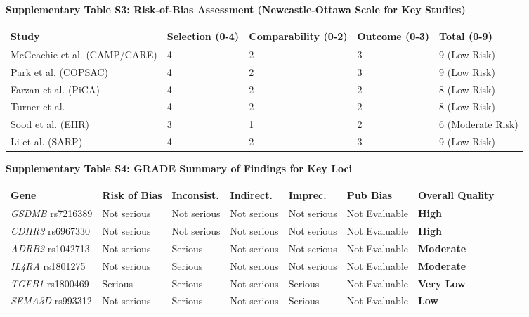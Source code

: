 \documentclass[11pt,a4paper]{article}
\begin{document}
\noindent\textbf{Supplementary Table S3: Risk-of-Bias Assessment (Newcastle-Ottawa Scale for Key Studies)}
\small\begin{center}\begin{longtable}{@{}p{3cm}p{3cm}p{3cm}p{3cm}p{2cm}@{}}
\toprule
\textbf{Study} & \textbf{Selection (0-4)} & \textbf{Comparability (0-2)} & \textbf{Outcome (0-3)} & \textbf{Total (0-9)} \\
\midrule
\endfirsthead
\midrule
\endhead
\bottomrule
\endfoot
\bottomrule
\endlastfoot
McGeachie et al. (CAMP/CARE) \cite{McGeachieWu2015} & 4 & 2 & 3 & 9 (Low Risk) \\
Park et al. (COPSAC) \cite{ParkTantisira2017} & 4 & 2 & 3 & 9 (Low Risk) \\
Farzan et al. (PiCA) \cite{FarzanVijverberg2018} & 4 & 2 & 2 & 8 (Low Risk) \\
Turner et al. \cite{TurnerFrancis2016} & 4 & 2 & 2 & 8 (Low Risk) \\
Sood et al. \cite{SoodConnolly2018} (EHR) & 3 & 1 & 2 & 6 (Moderate Risk) \\
Li et al. (SARP) \cite{LiChristenson2021} & 4 & 2 & 3 & 9 (Low Risk) \\
\end{longtable}\end{center}

\noindent\textbf{Supplementary Table S4: GRADE Summary of Findings for Key Loci}
\small\begin{center}\begin{longtable}{@{}p{2cm}p{1.8cm}p{1.8cm}p{1.8cm}p{1.8cm}p{2cm}p{2cm}@{}}
\toprule
Gene & \textbf{Risk of Bias} & Inconsist. & Indirect. & Imprec. & Pub Bias & \textbf{Overall Quality} \\
\midrule
\endfirsthead
\midrule
\endhead
\bottomrule
\endfoot
\bottomrule
\endlastfoot
\textit{GSDMB} rs7216389 & Not serious & Not serious & Not serious & Not serious & Not Evaluable & \textbf{High} \\
\textit{CDHR3} rs6967330 & Not serious & Not serious & Not serious & Not serious & Not Evaluable & \textbf{High} \\
\textit{ADRB2} rs1042713 & Not serious & Serious & Not serious & Not serious & Not Evaluable & \textbf{Moderate} \\
\textit{IL4RA} rs1801275 & Not serious & Serious & Not serious & Not serious & Not Evaluable & \textbf{Moderate} \\
\textit{TGFB1} rs1800469 & Serious & Serious & Not serious & Serious & Not Evaluable & \textbf{Very Low} \\
\textit{SEMA3D} rs993312 & Not serious & Serious & Not serious & Serious & Not Evaluable & \textbf{Low} \\
\end{longtable}\end{center}



\end{document}
